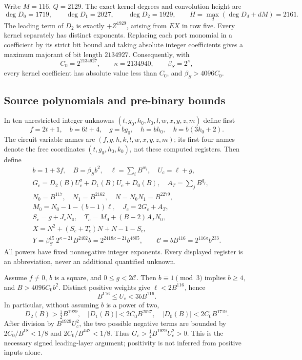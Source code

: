 Write $M=116$, $Q=2129$. The exact kernel degrees and convolution height are
\[
 \deg D_0=1719,\qquad\deg D_1=2027,\qquad\deg D_2=1929,\qquad
 H=\max_d(\deg D_d+dM)=2161.
\]
The leading term of $D_2$ is exactly $+Z^{1929}$, arising from $EX$ in
row five. Every kernel separately has distinct exponents. Replacing each
port monomial in a coefficient by its strict bit bound and taking absolute
integer coefficients gives a maximum majorant of bit length $2134927$.
Consequently, with
\[
 C_0=2^{2134927},\qquad\kappa=2134940,\qquad\beta_S=2^\kappa,
\]
every kernel coefficient has absolute value less than $C_0$, and
$\beta_S>4096C_0$.

\subsection{Source polynomials and pre-binary bounds}

In ten unrestricted integer unknowns $(t,g_0,h_0,k_0,l,w,x,y,z,m)$ define first
\[f=2t+1,\quad b=6t+4,\quad g=bg_0,\quad h=bh_0,\quad k=b(3k_0+2).\]
The circuit variable names are $(f,g,h,k,l,w,x,y,z,m)$; its first four names denote the free coordinates $(t,g_0,h_0,k_0)$, not these computed registers. Then define
\begin{gather*}
 b=1+3f,\quad B=\beta_S b^2,\quad\ell=\sum_i B^{w_i},\quad U_c=\ell+g,\\
 G_c=D_2(B)U_c^2+D_1(B)U_c+D_0(B),\quad A_T=\sum_j B^{q_j},\\
 N_0=B^{117},\quad N_1=B^{2162},\quad N=N_0N_1=B^{2279},\\
 M_0=N_0-1-(b-1)\ell,\quad J_c=2G_c+A_T,\\
 S_c=g+J_cN_0,\quad T_c=M_0+(B-2)A_TN_0,\\
 X=N^2+(S_c+T_c)N+N-1-S_c,\\
 Y=\beta_S^{15}\,2^{\kappa-21}B^{2402}b
   =2^{2418\kappa-21}b^{4805},\qquad
 \mathcal C=bB^{116}=2^{116\kappa}b^{233}.
\end{gather*}
All powers have fixed nonnegative integer exponents. Every displayed
register is an abbreviation, never an additional quantified unknown.

Assume $f\ne0$, $b$ is a square, and $0\le g<2\mathcal C$.
Then $b\equiv1\pmod3$ implies $b\ge4$, and $B>4096C_0b^2$.
Distinct positive weights give $\ell<2B^{116}$, hence
\[
 B^{116}\le U_c<3bB^{116}.
\]
In particular, without assuming $b$ is a power of two,
\[
 D_2(B)>\tfrac12B^{1929},\quad
 |D_1(B)|<2C_0B^{2027},\quad |D_0(B)|<2C_0B^{1719}.
\]
After division by $B^{1929}U_c^2$, the two possible negative terms
are bounded by $2C_0/B^{18}<1/8$ and $2C_0/B^{442}<1/8$.
Thus $G_c>\tfrac14B^{1929}U_c^2>0$. This is the necessary signed
leading-layer argument; positivity is not inferred from positive inputs
alone.

